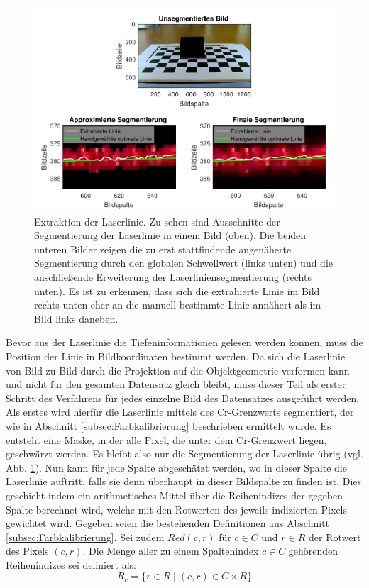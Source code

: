 \begin{figure}
\includegraphics[width=\textwidth]{images/LineSegmentationPlottedCramped2.pdf}
\caption[Extraktion der Laserlinie]{Extraktion der Laserlinie. Zu sehen sind Ausschnitte der Segmentierung der Laserlinie in einem Bild (oben). Die beiden unteren Bilder zeigen die zu erst stattfindende angenäherte Segmentierung durch den globalen Schwellwert (links unten) und die anschließende Erweiterung der Laserliniensegmentierung (rechts unten). Es ist zu erkennen, dass sich die extrahierte Linie im Bild rechts unten eher an die manuell bestimmte Linie annähert als im Bild links daneben.}\label{fig:LaserLinieExtraktion}
\end{figure}


Bevor aus der Laserlinie die Tiefeninformationen gelesen werden können, muss die Position der Linie in Bildkoordinaten bestimmt werden. Da sich die Laserlinie von Bild zu Bild durch die Projektion auf die Objektgeometrie verformen kann und nicht für den gesamten Datensatz gleich bleibt, muss dieser Teil als erster Schritt des Verfahrens für jedes einzelne Bild des Datensatzes ausgeführt werden. Als erstes wird hierfür die Laserlinie mittels des Cr-Grenzwerts segmentiert, der wie in Abschnitt \ref{subsec:Farbkalibrierung} beschrieben ermittelt wurde. Es entsteht eine Maske, in der alle Pixel, die unter dem Cr-Grenzwert liegen, geschwärzt werden. Es bleibt also nur die Segmentierung der Laserlinie übrig (vgl. Abb. \ref{fig:LaserLinieExtraktion}). Nun kann für jede Spalte abgeschätzt werden, wo in dieser Spalte die Laserlinie auftritt, falls sie denn überhaupt in dieser Bildspalte zu finden ist. Dies geschieht indem ein arithmetisches Mittel über die Reihenindizes der gegeben Spalte berechnet wird, welche mit den Rotwerten des jeweils indizierten Pixels gewichtet wird. Gegeben seien die bestehenden Definitionen aus Abschnitt \ref{subsec:Farbkalibrierung}. Sei zudem \(Red(c,r)\) für \(c \in C\) und \(r \in R\) der Rotwert des Pixels \((c,r)\). Die Menge aller zu einem Spaltenindex \(c \in C\) gehörenden Reihenindizes sei definiert als:
\begin{equation}
R_{c} = \lbrace r \in R \mid (c, r) \in C \times R \rbrace
\end{equation}

